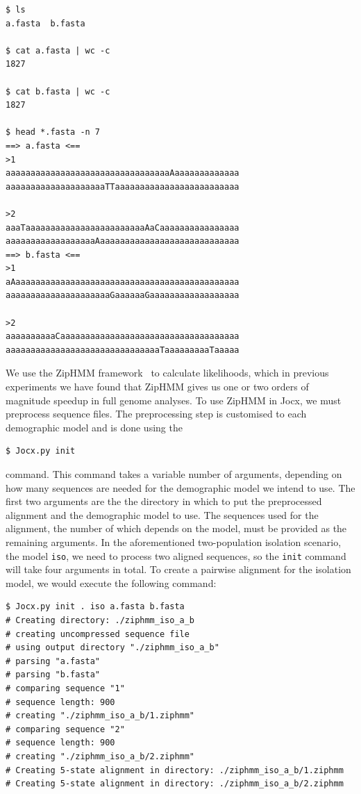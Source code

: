 \documentclass[graybox]{svmult}
\begin{document}
 {\scriptsize{}\begin{verbatim}
$ ls
a.fasta  b.fasta

$ cat a.fasta | wc -c
1827

$ cat b.fasta | wc -c
1827

$ head *.fasta -n 7
==> a.fasta <==
>1
aaaaaaaaaaaaaaaaaaaaaaaaaaaaaaaaaAaaaaaaaaaaaaa
aaaaaaaaaaaaaaaaaaaaTTaaaaaaaaaaaaaaaaaaaaaaaaa

>2
aaaTaaaaaaaaaaaaaaaaaaaaaaaaAaCaaaaaaaaaaaaaaaa
aaaaaaaaaaaaaaaaaaAaaaaaaaaaaaaaaaaaaaaaaaaaaaa
==> b.fasta <==
>1
aAaaaaaaaaaaaaaaaaaaaaaaaaaaaaaaaaaaaaaaaaaaaaa
aaaaaaaaaaaaaaaaaaaaaGaaaaaaGaaaaaaaaaaaaaaaaaa

>2
aaaaaaaaaaCaaaaaaaaaaaaaaaaaaaaaaaaaaaaaaaaaaaa
aaaaaaaaaaaaaaaaaaaaaaaaaaaaaaaTaaaaaaaaaTaaaaa
\end{verbatim}}


We use the ZipHMM framework~\cite{Sand:2013bia} to calculate likelihoods, which in previous experiments we have found that ZipHMM gives us one or two orders of magnitude speedup in full genome analyses. To use ZipHMM in Jocx, we must preprocess sequence files. The preprocessing step is customised to each demographic model and is done using the
 {\scriptsize{}\begin{verbatim}
$ Jocx.py init
\end{verbatim}}
command. This command takes a variable number of arguments, depending on how many sequences are needed for the demographic model we intend to use. The first two arguments are the the directory in which to put the preprocessed alignment and the demographic model to use. The sequences used for the alignment, the number of which depends on the model, must be provided as the remaining arguments. In the aforementioned two-population isolation scenario, the model \texttt{iso}, we need to process two aligned sequences, so the \texttt{init} command will take four arguments in total. To create a pairwise alignment for the isolation model, we would execute the following command:


 {\scriptsize{}\begin{verbatim}
$ Jocx.py init . iso a.fasta b.fasta
# Creating directory: ./ziphmm_iso_a_b
# creating uncompressed sequence file
# using output directory "./ziphmm_iso_a_b"
# parsing "a.fasta"
# parsing "b.fasta"
# comparing sequence "1"
# sequence length: 900
# creating "./ziphmm_iso_a_b/1.ziphmm"
# comparing sequence "2"
# sequence length: 900
# creating "./ziphmm_iso_a_b/2.ziphmm"
# Creating 5-state alignment in directory: ./ziphmm_iso_a_b/1.ziphmm
# Creating 5-state alignment in directory: ./ziphmm_iso_a_b/2.ziphmm
\end{verbatim}}
\end{document}
